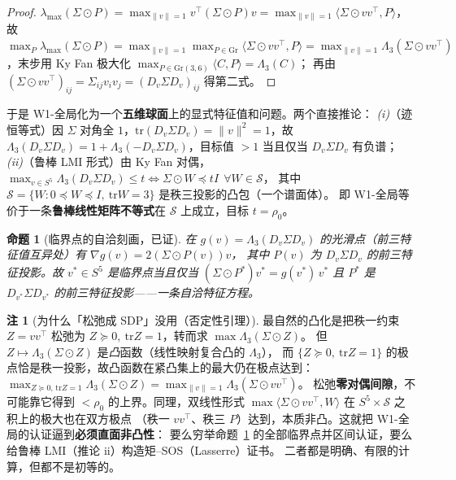 \documentclass[UTF8,11pt]{ctexart}
\newtheorem{proposition}[theorem]{命题}
\theoremstyle{definition}
\newtheorem{remark}[theorem]{注}
\newcommand{\Lam}{\Lambda}
\begin{document}
\begin{proof}
$\lambda_{\max}(\Sigma\odot P)=\max_{\|v\|=1}v^\top(\Sigma\odot P)v=\max_{\|v\|=1}\langle\Sigma\odot vv^\top,P\rangle$，
故 $\max_P\lambda_{\max}(\Sigma\odot P)=\max_{\|v\|=1}\max_{P\in\mathrm{Gr}}\langle\Sigma\odot vv^\top,P\rangle
=\max_{\|v\|=1}\Lam_3(\Sigma\odot vv^\top)$，末步用 Ky Fan 极大化 $\max_{P\in\mathrm{Gr}(3,6)}\langle C,P\rangle=\Lam_3(C)$；
再由 $(\Sigma\odot vv^\top)_{ij}=\Sigma_{ij}v_iv_j=(D_v\Sigma D_v)_{ij}$ 得第二式。
\end{proof}

于是 W1-全局化为一个\textbf{五维球面}上的显式特征值和问题。两个直接推论：
\emph{(i)}（迹恒等式）因 $\Sigma$ 对角全 $1$，$\mathrm{tr}(D_v\Sigma D_v)=\|v\|^2=1$，故
$\Lam_3(D_v\Sigma D_v)=1+\Lam_3(-D_v\Sigma D_v)$，目标值 $>1$ 当且仅当 $D_v\Sigma D_v$ 有负谱；
\emph{(ii)}（鲁棒 LMI 形式）由 Ky Fan 对偶，
$\max_{v\in S^5}\Lam_3(D_v\Sigma D_v)\le t\iff \Sigma\odot W\preceq tI\ \ \forall W\in\mathcal S$，
其中 $\mathcal S=\{W:0\preceq W\preceq I,\ \mathrm{tr}W=3\}$ 是秩三投影的凸包（一个谱面体）。
即 W1-全局等价于一条\textbf{鲁棒线性矩阵不等式}在 $\mathcal S$ 上成立，目标 $t=\rho_0$。

\begin{proposition}[临界点的自洽刻画，已证]\label{prop:w1kkt}
在 $g(v)=\Lam_3(D_v\Sigma D_v)$ 的光滑点（前三特征值互异处）有 $\nabla g(v)=2(\Sigma\odot P(v))v$，
其中 $P(v)$ 为 $D_v\Sigma D_v$ 的前三特征投影。故 $v^*\in S^5$ 是临界点当且仅当
$(\Sigma\odot P^*)v^*=g(v^*)\,v^*$ 且 $P^*$ 是 $D_{v^*}\Sigma D_{v^*}$ 的前三特征投影——一条自洽特征方程。
\end{proposition}

\begin{remark}[为什么「松弛成 SDP」没用（否定性引理）]\label{rmk:tight}
最自然的凸化是把秩一约束 $Z=vv^\top$ 松弛为 $Z\succeq0,\ \mathrm{tr}Z=1$，转而求 $\max\Lam_3(\Sigma\odot Z)$。
但 $Z\mapsto\Lam_3(\Sigma\odot Z)$ 是\emph{凸}函数（线性映射复合凸的 $\Lam_3$），
而 $\{Z\succeq0,\ \mathrm{tr}Z=1\}$ 的极点恰是秩一投影，故凸函数在紧凸集上的最大仍在极点达到：
$\max_{Z\succeq0,\,\mathrm{tr}Z=1}\Lam_3(\Sigma\odot Z)=\max_{\|v\|=1}\Lam_3(\Sigma\odot vv^\top)$。
松弛\textbf{零对偶间隙}，不可能靠它得到 $<\rho_0$ 的上界。同理，双线性形式
$\max\langle\Sigma\odot vv^\top,W\rangle$ 在 $S^5\times\mathcal S$ 之积上的极大也在双方极点
（秩一 $vv^\top$、秩三 $P$）达到，本质非凸。这就把 W1-全局的认证逼到\textbf{必须直面非凸性}：
要么穷举命题~\ref{prop:w1kkt} 的全部临界点并区间认证，要么给鲁棒 LMI（推论 ii）构造矩--SOS（Lasserre）证书。
二者都是明确、有限的计算，但都不是初等的。
\end{remark}
\end{document}
